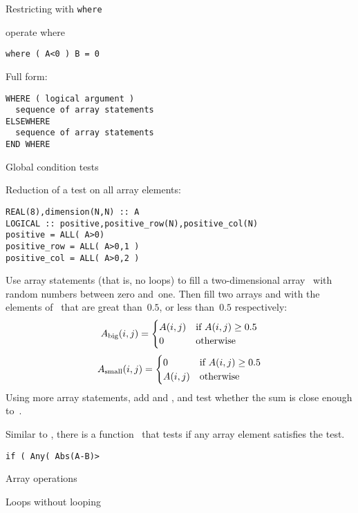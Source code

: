  {Restricting with \tt{where}}

\begin{block}{operate where}
  \label{sl:farray-where}
\begin{verbatim}
where ( A<0 ) B = 0
\end{verbatim}

Full form:
\begin{verbatim}
WHERE ( logical argument )
  sequence of array statements
ELSEWHERE
  sequence of array statements
END WHERE
\end{verbatim}
\end{block}

 {Global condition tests}

Reduction of a test on all array elements:
\begin{verbatim}
REAL(8),dimension(N,N) :: A
LOGICAL :: positive,positive_row(N),positive_col(N)
positive = ALL( A>0)
positive_row = ALL( A>0,1 )
positive_col = ALL( A>0,2 )
\end{verbatim}

\begin{exercise}
  Use array statements (that is, no loops) to fill a two-dimensional
  array~ with random numbers between zero and~one. Then fill two
  arrays  and  with the elements of~ that are
  great than~$0.5$, or less than~$0.5$ respectively:
  \[ A_{\scriptstyle\mathrm{big}}(i,j) =
  \begin{cases}
    A(i,j)&\hbox{if $A(i,j)\geq 0.5$}\\ 0&\hbox{otherwise}
  \end{cases}
  \]
  \[ A_{\scriptstyle\mathrm{small}}(i,j) =
  \begin{cases}
    0&\hbox{if $A(i,j)\geq 0.5$}\\ A(i,j)&\hbox{otherwise}
  \end{cases}
  \]
  Using more array statements, add  and , and test
  whether the sum is close enough to~.
\end{exercise}

Similar to , there is a function~ that tests
if any array element satisfies the test.
\begin{verbatim}
if ( Any( Abs(A-B)>
\end{verbatim}

 {Array operations}

 {Loops without looping}

